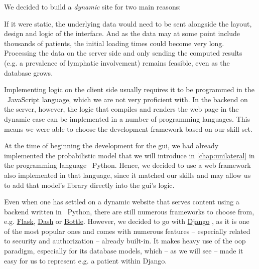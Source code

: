 \documentclass[\relativeRoot/main.tex]{subfiles}
\begin{document}
We decided to build a \emph{dynamic} site for two main reasons: 
\begin{enumerate*}[label={(\arabic*)}]
    \item If it were static, the underlying data would need to be sent alongside the layout, design and logic of the interface. And as the data may at some point include thousands of patients, the initial loading times could become very long. Processing the data on the server side and only sending the computed results (e.g. a prevalence of lymphatic involvement) remains feasible, even as the database grows.
    \item Implementing logic on the client side usually requires it to be programmed in the ~JavaScript language, which we are not very proficient with. In the backend on the server, however, the logic that compiles and renders the web page in the dynamic case can be implemented in a number of programming languages. This means we were able to choose the development framework based on our skill set.
\end{enumerate*}

At the time of beginning the development for the \gls{gui}, we had already implemented the probabilistic model that we will introduce in \cref{chap:unilateral} in the programming language ~Python. Hence, we decided to use a web framework also implemented in that language, since it matched our skills and may allow us to add that model's library directly into the \gls{gui}'s logic.

Even when one has settled on a dynamic website that serves content using a backend written in ~Python, there are still numerous frameworks to choose from, e.g. \href{https://flask.palletsprojects.com/en/2.2.x/}{Flask}, \href{https://plotly.com/dash/}{Dash} or \href{http://bottlepy.org/docs/dev/}{Bottle}. However, we decided to go with \href{https://www.djangoproject.com/}{Django} \cite{noauthor_django_2022}, as it is one of the most popular ones and comes with numerous features -- especially related to security and authorization -- already built-in. It makes heavy use of the \acrlong{oop} paradigm, especially for its database models, which -- as we will see -- made it easy for us to represent e.g. a patient within Django.
\end{document}
